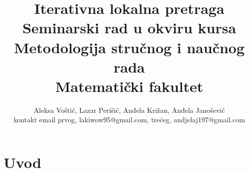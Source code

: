 \documentclass[a4paper]{article}
\begin{document}
\title{Iterativna lokalna pretraga\\ \small{Seminarski rad u okviru kursa\\Metodologija stručnog i naučnog rada\\ Matematički fakultet}}

\author{Aleksa Voštić, Lazar Perišić, Anđela Križan, Anđela Janošević\\ kontakt email prvog, lakiwow95@gmail.com, trećeg, andjelaj197@gmail.com}


\maketitle

\abstract{}

\tableofcontents

\newpage
\section{Uvod}
\label{sec:uvod}
\end{document}
